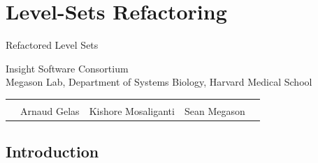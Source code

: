 \section{Level-Sets Refactoring}
{
\color{white}
\begin{frame}[plain]
\fontsize{36pt}{36pt}\selectfont
\center
\begin{center}
Refactored Level Sets
\vskip12pt
\end{center}

\fontsize{12pt}{12pt}\selectfont
Insight Software Consortium\\
Megason Lab, Department of Systems Biology, Harvard Medical School
\vskip12pt
\begin{tabular}{cp{}p{}p{}c}
\\
\\
&
\centering{}Arnaud Gelas &
\centering{}Kishore Mosaliganti &
\centering{}Sean Megason & \\
\end{tabular}
\end{frame}
}

\subsection{Introduction}



